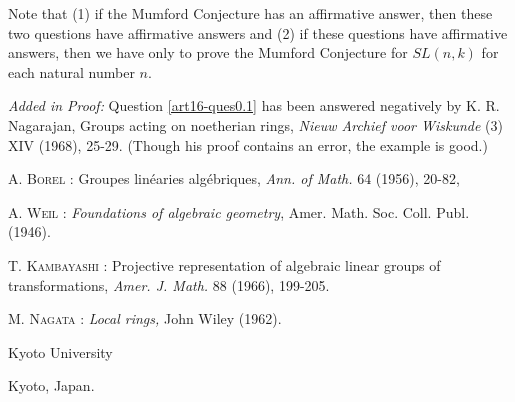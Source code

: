 Note that (1) if the Mumford Conjecture has an affirmative answer, then these two questions have affirmative answers and (2) if these questions have affirmative answers, then we have only to prove the Mumford Conjecture for $SL(n,k)$ for each natural number $n$.

{\em Added in Proof:} Question \ref{art16-ques0.1} has been answered negatively by K. R. Nagarajan, Groups acting on noetherian rings, {\em Nieuw Archief voor Wiskunde} (3) XIV (1968), 25-29. (Though his proof contains an error, the example is good.)

\begin{thebibliography}{99}
 \textsc{A. Borel :} Groupes lin\'earies alg\'ebriques, {\em Ann. of Math.} 64 (1956), 20-82,

 \textsc{A. Weil :} {\em Foundations of algebraic geometry}, Amer. Math. Soc. Coll. Publ. (1946).

 \textsc{T. Kambayashi :} Projective representation of algebraic linear groups of transformations, {\em Amer. J. Math.} 88 (1966), 199-205.

 \textsc{M. Nagata :} {\em Local rings,} John Wiley (1962).
\end{thebibliography}

\bigskip

\noindent
{\small Kyoto University}

\noindent
{\small Kyoto, Japan.}



